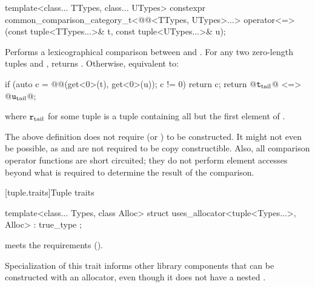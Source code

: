 %
\begin{itemdecl}
template<class... TTypes, class... UTypes>
  constexpr common_comparison_category_t<@@<TTypes, UTypes>...>
    operator<=>(const tuple<TTypes...>& t, const tuple<UTypes...>& u);
\end{itemdecl}

\begin{itemdescr}
\pnum
\effects
Performs a lexicographical comparison between  and .
For any two zero-length tuples  and ,
 returns .
Otherwise, equivalent to:
\begin{codeblock}
if (auto c = @@(get<0>(t), get<0>(u)); c != 0) return c;
return @$\texttt{t}_\mathrm{tail}$@ <=> @$\texttt{u}_\mathrm{tail}$@;
\end{codeblock}
where $\texttt{r}_\mathrm{tail}$ for some tuple 
is a tuple containing all but the first element of .
\end{itemdescr}

\pnum
\begin{note}
The above definition does not require 
(or ) to be constructed. It might not
even be possible, as  and  are not required to be copy
constructible. Also, all comparison operator functions are short circuited;
they do not perform element accesses beyond what is required to determine the
result of the comparison.
\end{note}

[tuple.traits]{Tuple traits}

%
\begin{itemdecl}
template<class... Types, class Alloc>
  struct uses_allocator<tuple<Types...>, Alloc> : true_type { };
\end{itemdecl}

\begin{itemdescr}
\pnum
\expects
{} meets the 
requirements ().

\pnum
\begin{note}
Specialization of this trait informs other library components that
 can be constructed with an allocator, even though it does not have
a nested .
\end{note}
\end{itemdescr}

